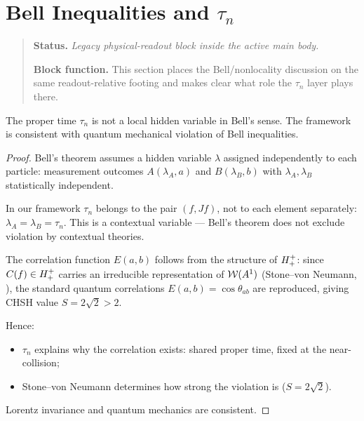 
\section[Bell Inequalities and tau-n]{Bell Inequalities and \texorpdfstring{$\tau_n$}{tau_n}}
\begin{quote}\small
\noindent\textbf{Status.} \emph{Legacy physical-readout block inside the active main body.}\par
\noindent\textbf{Block function.} This section places the Bell/nonlocality discussion on the same readout-relative footing and makes clear what role the $\tau_n$ layer plays there.
\end{quote}
\label{sec:bell}

\begin{theorem}
\label{thm:bell-consistency}
The proper time $\tau_n$ is not a local hidden variable in Bell's sense.
The framework is consistent with quantum mechanical violation of Bell
inequalities.
\begin{proof}
Bell's theorem assumes a hidden variable $\lambda$ assigned independently
to each particle: measurement outcomes $A(\lambda_A,a)$ and
$B(\lambda_B,b)$ with $\lambda_A,\lambda_B$ statistically independent.

In our framework $\tau_n$ belongs to the pair $(f,Jf)$, not to each
element separately: $\lambda_A=\lambda_B=\tau_n$.
This is a contextual variable --- Bell's theorem does not exclude
violation by contextual theories.

The correlation function $E(a,b)$ follows from the structure of
$H^+_+$: since $C(f)\in H^+_+$ carries an irreducible
representation of $\mathcal{W}(A^1)$ (Stone--von Neumann, \cite{brendecke2026rh}),
the standard quantum correlations $E(a,b)=\cos\theta_{ab}$ are
reproduced, giving CHSH value $S=2\sqrt{2}>2$.

Hence:
\begin{itemize}
 \item $\tau_n$ explains why the correlation exists: shared proper time,
 fixed at the near-collision;
 \item Stone--von Neumann determines how strong the violation is
 ($S=2\sqrt{2}$).
\end{itemize}
Lorentz invariance and quantum mechanics are consistent.
\end{proof}
\end{theorem}

